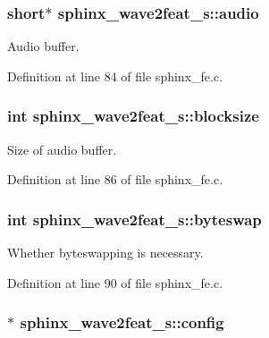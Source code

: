 \subsubsection[{audio}]{\setlength{\rightskip}{0pt plus 5cm}short$\ast$ sphinx\+\_\+wave2feat\+\_\+s\+::audio}\label{structsphinx__wave2feat__s_a776c72734abe1e34162a5ee347f533e5}


Audio buffer. 



Definition at line 84 of file sphinx\+\_\+fe.\+c.

\subsubsection[{blocksize}]{\setlength{\rightskip}{0pt plus 5cm}int sphinx\+\_\+wave2feat\+\_\+s\+::blocksize}\label{structsphinx__wave2feat__s_aff2646e41780ceb9dcd234c719fd25f1}


Size of audio buffer. 



Definition at line 86 of file sphinx\+\_\+fe.\+c.

\subsubsection[{byteswap}]{\setlength{\rightskip}{0pt plus 5cm}int sphinx\+\_\+wave2feat\+\_\+s\+::byteswap}\label{structsphinx__wave2feat__s_a030717e2736fd04d1a281f51e5db2799}


Whether byteswapping is necessary. 



Definition at line 90 of file sphinx\+\_\+fe.\+c.

\subsubsection[{config}]{$\ast$ sphinx\+\_\+wave2feat\+\_\+s\+::config}\label{structsphinx__wave2feat__s_a484d308befbde315664da8520ebc410d}


